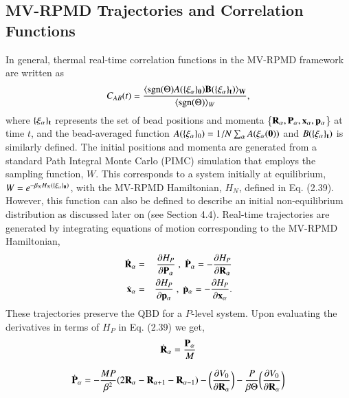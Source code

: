 \documentclass[phd,tocprelim]{cornell}
\begin{document}
\subsection{MV-RPMD Trajectories and Correlation Functions}
In general, thermal real-time correlation functions in the 
MV-RPMD framework are written as 
\begin{equation} 
\label{eq:tcorr}
C_{AB}(t) = \frac{\langle \textrm{sgn}(\Theta) A(\{\bf{\xi}_\alpha\}_0)
B(\{\bf{\xi}_\alpha\}_t) \rangle_{W}}{\langle \textrm{sgn}(\Theta) \rangle_W},
\end{equation} 
where $\{\bf{\xi}_\alpha\}_t$ represents the set of 
bead positions and momenta \{$\bf{R}_{\alpha},\bf{P}_{\alpha}, 
\bf{x}_{\alpha},\bf{p}_{\alpha}$\} at time $t$,
and the bead-averaged function $A(\{{\bf{\xi}}_\alpha\}_0)=
1/N \sum_\alpha A(\bf{\xi}_\alpha (0))$ and $B(\{\bf{\xi}_\alpha\}_t)$ 
is similarly defined.
The initial positions and momenta are generated from 
a standard Path Integral Monte Carlo (PIMC) simulation
that employs the sampling function, $W$. 
This corresponds to a system initially at equilibrium,  
$W = e^{-\beta_{{N}} H_{N}(\{\bf{\xi}_\alpha\}_0)}$, with 
the MV-RPMD Hamiltonian, $H_N $, defined in 
Eq. (2.39). However, this function can 
also be defined to describe an initial non-equilibrium 
distribution as discussed later on (see Section 4.4).
Real-time trajectories are generated by integrating 
equations of motion corresponding to the 
MV-RPMD Hamiltonian,
\begin{eqnarray}
\nonumber
\dot{{\bf{R}}}_{\alpha}&=& 
\frac{\partial H_P}{\partial
{\bf{P}}_{\alpha}}\;,\;
\dot{{\bf{P}}}_{\alpha}= -\frac{\partial
H_P}{\partial {\bf{R}}_{\alpha}}\\
\dot{{\bf{x}}}_{\alpha}&=&  \frac{\partial
H_P}{\partial {\bf{p}}_{\alpha}}\;,\;
\hfill \hfill \dot{{\bf{p}}}_{\alpha}=
-\frac{\partial H_P}{\partial
{\bf{x}}_{\alpha}}. 
\label{eq:eom2}
\end{eqnarray}
These trajectories preserve the QBD for a $P$-level system. Upon evaluating the derivatives in terms of $H_P$ in Eq. (2.39) we get, 
\begin{equation}
 \dot{{\bf{R}}}_{\alpha} = \frac{{\bf{P}}_{\alpha}}{M}
\end{equation}

\begin{equation}
 \dot{{\bf{P}}}_{\alpha} =-\frac{MP}{\beta^2} (2 {\bf{R}}_{\alpha}- {\bf{R}}_{\alpha+1}- {\bf{R}}_{\alpha-1})  -\bigg( \frac{\partial V_0}{\partial {\bf{R}}_{\alpha}} \bigg)  -\frac{P}{\beta \Theta} \bigg( \frac{\partial V_0}{\partial {\bf{R}}_{\alpha}} \bigg)
\end{equation}
\end{document}

